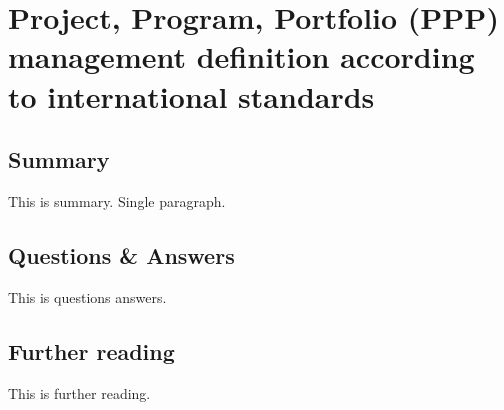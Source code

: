 \section{Project, Program, Portfolio (PPP) management definition according to international standards}

\subsection{Summary}
This is summary. Single paragraph.

\subsection{Questions \& Answers}
This is questions answers.

\subsection{Further reading}
This is further reading.
